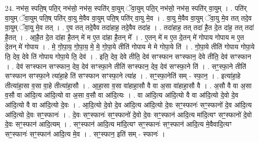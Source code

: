 \documentclass[17pt]{extarticle}
\begin{document}
24. नभ॑स॒ स्पति॒ष् पति॒र् नभ॑सो॒ नभ॑स॒ स्पति॑र् वा॒युम् ॅवा॒युम् पति॒र् नभ॑सो॒ नभ॑स॒ स्पति॑र् वा॒युम् । . पति॑र् वा॒युम् ॅवा॒युम् पति॒ष् पति॑र् वा॒यु मे॒वैव वा॒युम् पति॒ष् पति॑र् वा॒यु मे॒व । . वा॒यु मे॒वैव वा॒युम् ॅवा॒यु मे॒व तत् तदे॒व वा॒युम् ॅवा॒यु मे॒व तत् । . ए॒व तत् तदे॒वैव तदा॑हाह॒ तदे॒वैव तदा॑ह । . तदा॑हाह॒ तत् तदा॑ है॒त दे॒त दा॑ह॒ तत् तदा॑ है॒तत् । . आ॒है॒त दे॒त दा॑हा है॒तन् मे॑ म ए॒त दा॑हा है॒तन् मे᳚ । . ए॒तन् मे॑ म ए॒त दे॒तन् मे॑ गोपाय गोपाय म ए॒त दे॒तन् मे॑ गोपाय । . मे॒ गो॒पा॒य॒ गो॒पा॒य॒ मे॒ मे॒ गो॒पा॒ये तीति॑ गोपाय मे मे गोपा॒ये ति॑ । . गो॒पा॒ये तीति॑ गोपाय गोपा॒ये ति॒ देव॒ देवे ति॑ गोपाय गोपा॒ये ति॒ देव॑ । . इति॒ देव॒ देवे तीति॒ देव॑ सꣳस्फान सꣳस्फान॒ देवे तीति॒ देव॑ सꣳस्फान । . देव॑ सꣳस्फान सꣳस्फान॒ देव॒ देव॑ सꣳस्फा॒ने तीति॑ सꣳस्फान॒ देव॒ देव॑ सꣳस्फा॒ने ति॑ । . सꣳ॒॒स्फा॒ने तीति॑ सꣳस्फान सꣳस्फा॒ने त्या॑हा॒हे ति॑ सꣳस्फान सꣳस्फा॒ने त्या॑ह । . सꣳ॒॒स्फा॒नेति॑ सम् - स्फा॒न॒ । . इत्या॑हा॒हे तीत्या॑हा॒सा व॒सा वा॒हे तीत्या॑हा॒सौ । . आ॒हा॒सा व॒सा वा॑हाहा॒सौ वै वा अ॒सा वा॑हाहा॒सौ वै । . अ॒सौ वै वा अ॒सा व॒सौ वा आ॑दि॒त्य आ॑दि॒त्यो वा अ॒सा व॒सौ वा आ॑दि॒त्यः । . वा आ॑दि॒त्य आ॑दि॒त्यो वै वा आ॑दि॒त्यो दे॒वो दे॒व आ॑दि॒त्यो वै वा आ॑दि॒त्यो दे॒वः । . आ॒दि॒त्यो दे॒वो दे॒व आ॑दि॒त्य आ॑दि॒त्यो दे॒वः सꣳ॒॒स्फानः॑ सꣳ॒॒स्फानो॑ दे॒व आ॑दि॒त्य आ॑दि॒त्यो दे॒वः सꣳ॒॒स्फानः॑ । . दे॒वः सꣳ॒॒स्फानः॑ सꣳ॒॒स्फानो॑ दे॒वो दे॒वः सꣳ॒॒स्फान॑ आदि॒त्य मा॑दि॒त्यꣳ सꣳ॒॒स्फानो॑ दे॒वो दे॒वः सꣳ॒॒स्फान॑ आदि॒त्यम् । . सꣳ॒॒स्फान॑ आदि॒त्य मा॑दि॒त्यꣳ सꣳ॒॒स्फानः॑ सꣳ॒॒स्फान॑ आदि॒त्य मे॒वैवादि॒त्यꣳ सꣳ॒॒स्फानः॑ सꣳ॒॒स्फान॑ आदि॒त्य मे॒व । . सꣳ॒॒स्फान॒ इति॑ सम् - स्फानः॑ । \newline
\end{document}
